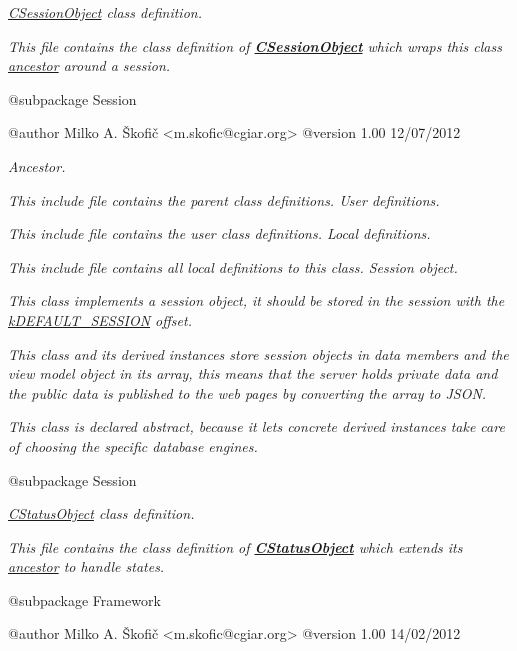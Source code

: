 {\itshape {\itshape \hyperlink{class_c_session_object}{C\-Session\-Object}} class definition.}

{\itshape This file contains the class definition of {\bfseries \hyperlink{class_c_session_object}{C\-Session\-Object}} which wraps this class \hyperlink{class_c_array_object}{ancestor} around a session.}

{\itshape \begin{DoxyVerb} @subpackage        Session

 @author            Milko A. Škofič <m.skofic@cgiar.org>
 @version   1.00 12/07/2012\end{DoxyVerb}
}

{\itshape Ancestor.}

{\itshape This include file contains the parent class definitions. User definitions.}

{\itshape This include file contains the user class definitions. Local definitions.}

{\itshape This include file contains all local definitions to this class. Session object.}

{\itshape This class implements a session object, it should be stored in the session with the \hyperlink{}{k\-D\-E\-F\-A\-U\-L\-T\-\_\-\-S\-E\-S\-S\-I\-O\-N} offset.}

{\itshape This class and its derived instances store session objects in data members and the view model object in its array, this means that the server holds private data and the public data is published to the web pages by converting the array to J\-S\-O\-N.}

{\itshape This class is declared abstract, because it lets concrete derived instances take care of choosing the specific database engines.}

{\itshape \begin{DoxyVerb} @subpackage        Session\end{DoxyVerb}
}

{\itshape {\itshape \hyperlink{class_c_status_object}{C\-Status\-Object}} class definition.}

{\itshape This file contains the class definition of {\bfseries \hyperlink{class_c_status_object}{C\-Status\-Object}} which extends its \hyperlink{class_c_array_object}{ancestor} to handle states.}

{\itshape \begin{DoxyVerb} @subpackage        Framework

 @author            Milko A. Škofič <m.skofic@cgiar.org>
 @version   1.00 14/02/2012\end{DoxyVerb}
}

